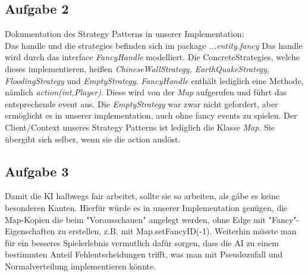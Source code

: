 \documentclass[a4paper]{article}
\begin{document}
\subsection*{Aufgabe 2}
Dokumentation des Strategy Patterns in unserer Implementation:\\[0.5cm]
Das handle und die strategies befinden sich im package \textit{...entity.fancy}
 Das handle wird durch das interface \textit{FancyHandle} modelliert. Die ConcreteStrategies, welche dieses implementieren, heißen \textit{ChineseWallStrategy, EarthQuakeStrategy, FloodingStrategy} und \textit{EmptyStrategy}. \textit{FancyHandle} enthält lediglich eine Methode, nämlich \textit{action(int,Player)}. Diese wird von der \textit{Map} aufgerufen und führt das entsprechende event aus. Die \textit{EmptyStrategy} war zwar nicht gefordert, aber ermöglicht es in unserer implementation, auch ohne fancy events zu spielen. Der Client/Context unseres Strategy Patterns ist lediglich die Klasse \textit{Map}. Sie übergibt sich selber, wenn sie die action auslöst.
\subsection*{Aufgabe 3}
	Damit die KI halbwegs fair arbeitet, sollte sie so arbeiten, als gäbe es keine besonderen Kanten. Hierfür würde es in unserer Implementation genügen, die Map-Kopien die beim "Vorausschauen" angelegt werden, ohne Edge mit "Fancy"-Eigenschaften zu erstellen, z.B. mit Map.setFancyID(-1). Weiterhin müsste man für ein besseres Spielerlebnis vermutlich dafür sorgen, dass die AI zu einem bestimmten Anteil Fehlentscheidungen trifft, was man mit Pseudozufall und Normalverteilung implementieren könnte. 
\end{document}
